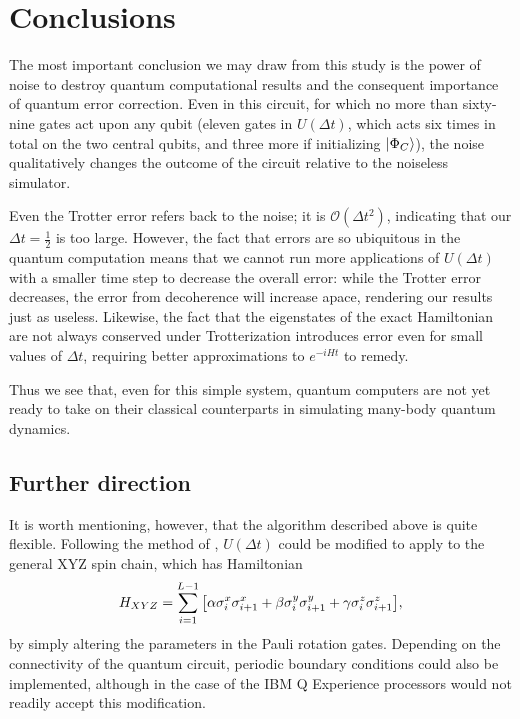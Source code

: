 \documentclass[10pt]{amsart}
\theoremstyle{definition}
\newcommand{\Sum}{\ensuremath{\displaystyle\sum}}          %
\newcommand{\Ord}{\ensuremath{\mathcal{O}}}                %
\begin{document}
\clearpage


\section{Conclusions} \label{sec:conclusion}

The most important conclusion we may draw from this study is the power of noise
to destroy quantum computational results and the consequent importance of
quantum error correction. Even in this circuit, for which no more than 
sixty-nine gates act upon any qubit (eleven gates in $U(\Delta t)$, which acts
six times in total on the two central qubits, and three more if initializing
$\ket{\Phi_C}$), the noise qualitatively changes the outcome of the circuit
relative to the noiseless simulator.

Even the Trotter error refers back to the noise; it is $\Ord(\Delta t^2)$,
indicating that our $\Delta t = \frac12$ is too large. However, the fact that
errors are so ubiquitous in the quantum computation means that we cannot run
more applications of $U(\Delta t)$ with a smaller time step to decrease the
overall error: while the Trotter error decreases, the error from decoherence
will increase apace, rendering our results just as useless. Likewise, the fact
that the eigenstates of the exact Hamiltonian are not always conserved under
Trotterization introduces error even for small values of $\Delta t$, requiring
better approximations to $e^{-i H t}$ to remedy.

Thus we see that, even for this simple system, quantum computers are not yet
ready to take on their classical counterparts in simulating many-body quantum
dynamics.


\subsection{Further direction} \label{subsec:further}

It is worth mentioning, however, that the algorithm described above is quite
flexible. Following the method of \cite{Vatan2004}, $U(\Delta t)$ could be
modified to apply to the general XYZ spin chain, which has Hamiltonian
\[
  H_{XYZ} = \Sum_{i=1}^{L-1} \qty[\alpha \sigma_i^x \sigma_{i+1}^x 
        + \beta \sigma_i^y \sigma_{i+1}^y + \gamma \sigma_i^z \sigma_{i+1}^z],
\]
by simply altering the parameters in the Pauli rotation gates. Depending on the
connectivity of the quantum circuit, periodic boundary conditions could also be
implemented, although in the case of the IBM Q Experience processors would not
readily accept this modification.
\end{document}
